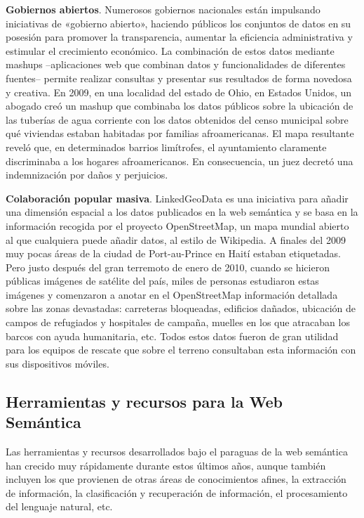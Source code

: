 \textbf{Gobiernos abiertos}. Numerosos gobiernos nacionales están impulsando iniciativas de «gobierno abierto», haciendo públicos los conjuntos de datos en su posesión para promover la transparencia, aumentar la eficiencia administrativa y estimular el crecimiento económico. La combinación de estos datos mediante mashups –aplicaciones web que combinan datos y funcionalidades de diferentes fuentes– permite realizar consultas y presentar sus resultados de forma novedosa y creativa. En 2009, en una localidad del estado de Ohio, en Estados Unidos, un abogado creó un mashup que combinaba los datos públicos sobre la ubicación de las tuberías de agua corriente con los datos obtenidos del censo municipal sobre qué viviendas estaban habitadas por familias afroamericanas. El mapa resultante reveló que, en determinados barrios limítrofes, el ayuntamiento claramente discriminaba a los hogares afroamericanos. En consecuencia, un juez decretó una indemnización por daños y perjuicios.


\textbf{Colaboración popular masiva}. LinkedGeoData es una iniciativa para añadir una dimensión espacial a los datos publicados en la web semántica y se basa en la información recogida por el proyecto OpenStreetMap, un mapa mundial abierto al que cualquiera puede añadir datos, al estilo de Wikipedia. A finales del 2009 muy pocas áreas de la ciudad de Port-au-Prince en Haití estaban etiquetadas. Pero justo después del gran terremoto de enero de 2010, cuando se hicieron públicas imágenes de satélite del país, miles de personas estudiaron estas imágenes y comenzaron a anotar en el OpenStreetMap información detallada sobre las zonas devastadas: carreteras bloqueadas, edificios dañados, ubicación de campos de refugiados y hospitales de campaña, muelles en los que atracaban los barcos con ayuda humanitaria, etc. Todos estos datos fueron de gran utilidad para los equipos de rescate que sobre el terreno consultaban esta información con sus dispositivos móviles.

\subsection{Herramientas y recursos para la Web Semántica}

Las herramientas y recursos desarrollados bajo el paraguas de la web semántica han crecido muy rápidamente durante estos últimos años, aunque también incluyen los que provienen de otras áreas de conocimientos afines, la extracción de información, la clasificación y recuperación de información, el procesamiento del lenguaje natural, etc.


